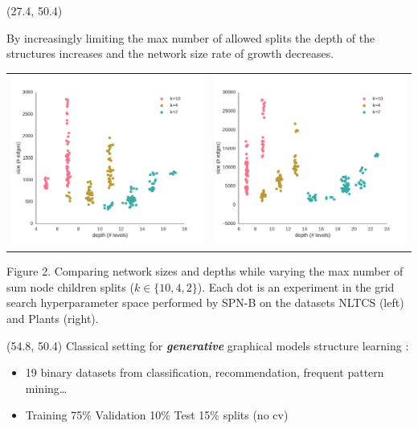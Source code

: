 \documentclass[final]{beamer}
\begin{document}
\begin{frame}{}
  \begin{textblock}{25.2}(27.4, 50.4)

    \footnotesize
    By increasingly limiting the max number of allowed splits the depth of the
    structures increases and the network size rate of growth
    decreases.  
    \begin{table}[ht]
      \setlength{\tabcolsep}{30pt}  
      \centering
      \begin{tabular}{c c}
        \includegraphics[width=0.4\linewidth]{figures/nltcs-depth.pdf}&\includegraphics[width=0.4\linewidth]{figures/plants-depth.pdf}
      \end{tabular}
    \end{table}
    \vspace{-20pt}
    \begin{center}
      \begin{minipage}[t]{0.9\linewidth}
        \tiny\flushleft
        Figure 2. Comparing network sizes and depths while varying the max
        number of sum node children splits ($k\in\{10, 4, 2\}$). Each dot is an experiment
        in the grid search hyperparameter space performed by
        \textsf{SPN-B} on the datasets NLTCS (left) and
        Plants (right).
      \end{minipage}
    \end{center}

    
  \end{textblock}
  
  \begin{textblock}{25.2}(54.8, 50.4)
    \footnotesize
    Classical setting for \emph{\textbf{generative}} graphical models
    structure learning \parencite{Gens2013}:
    \setlength{\leftmargini}{30pt}
    \begin{itemize}
      \itemsep 7pt
    \item 19 binary datasets from classification, recommendation,
      frequent pattern mining\dots \parencite{Haaren2012}
    \item Training 75\% Validation 10\% Test 15\%  splits (no cv)
    \end{itemize}\bigskip


\end{textblock}
\end{frame}
\end{document}
